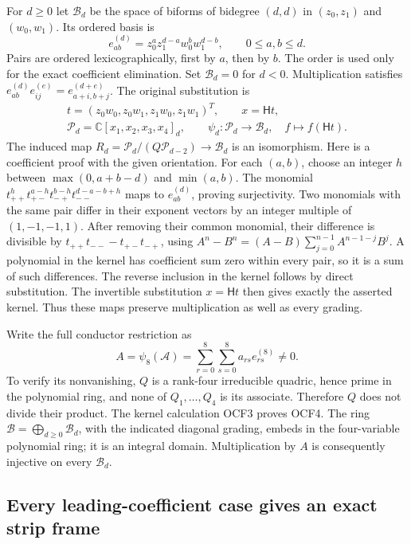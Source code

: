 For $d\geq0$ let $\mathcal B_d$ be the space of biforms of
bidegree $(d,d)$ in $(z_0,z_1)$ and $(w_0,w_1)$. Its ordered basis is
\[
 e_{ab}^{(d)}=z_0^a z_1^{d-a}w_0^b w_1^{d-b},
 \qquad 0\leq a,b\leq d.
 \tag{OCF2}
\]
Pairs are ordered lexicographically, first by $a$, then by $b$.
The order is used only for the exact coefficient elimination.
Set $\mathcal B_d=0$ for $d<0$. Multiplication satisfies
$e_{ab}^{(d)}e_{ij}^{(e)}=e_{a+i,b+j}^{(d+e)}$.
The original substitution is
\[
 \begin{gathered}
 t=(z_0w_0,z_0w_1,z_1w_0,z_1w_1)^T,\qquad x=\mathsf Ht,\\
 \mathscr P_d=\mathbb C[x_1,x_2,x_3,x_4]_d,\qquad
 \psi_d:\mathscr P_d\longrightarrow\mathcal B_d,\quad
 f\longmapsto f(\mathsf Ht).
 \end{gathered}\tag{OCF3}
\]
The induced map
$R_d=\mathscr P_d/(Q\mathscr P_{d-2})\longrightarrow\mathcal B_d$
is an isomorphism. Here is a coefficient proof with the given
orientation. For each $(a,b)$, choose an integer
$h$ between $\max(0,a+b-d)$ and $\min(a,b)$. The monomial
$t_{++}^{h}t_{+-}^{a-h}t_{-+}^{b-h}t_{--}^{d-a-b+h}$ maps
to $e_{ab}^{(d)}$, proving surjectivity. Two monomials with
the same pair differ in their exponent vectors by an integer
multiple of $(1,-1,-1,1)$. After removing their common monomial,
their difference is divisible by $t_{++}t_{--}-t_{+-}t_{-+}$,
using $A^n-B^n=(A-B)\sum_{j=0}^{n-1}A^{n-1-j}B^j$.
A polynomial in the kernel has coefficient sum zero within every
pair, so it is a sum of such differences. The reverse inclusion
in the kernel follows by direct substitution. The invertible
substitution $x=\mathsf Ht$ then gives exactly the asserted kernel.
Thus these maps preserve multiplication as well as every grading.

Write the full conductor restriction as
\[
 A=\psi_8(\mathcal A)
     =\sum_{r=0}^8\sum_{s=0}^8 a_{rs}e_{rs}^{(8)}\ne0.
 \tag{OCF4}
\]
To verify its nonvanishing, $Q$ is a rank-four irreducible quadric,
hence prime in the polynomial ring, and none of $Q_1,\ldots,Q_4$
is its associate. Therefore $Q$ does not divide their product.
The kernel calculation OCF3 proves OCF4. The ring
$\mathcal B=\bigoplus_{d\geq0}\mathcal B_d$, with the indicated
diagonal grading, embeds in the four-variable polynomial ring;
it is an integral domain. Multiplication by $A$ is consequently
injective on every $\mathcal B_d$.

\subsection{Every leading-coefficient case gives an exact strip frame}

